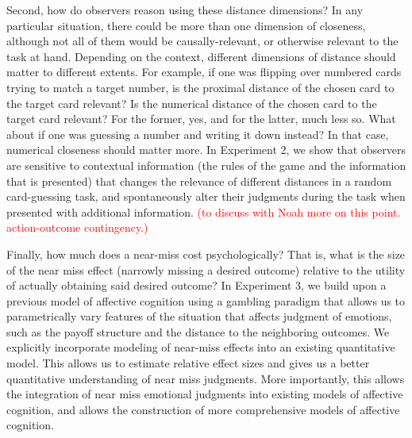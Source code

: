 \documentclass[10pt,letterpaper]{article}
\begin{document}

Second, how do observers reason using these distance dimensions? In any particular situation, there could be more than one dimension of closeness, although not all of them would be causally-relevant, or otherwise relevant to the task at hand. Depending on the context, different dimensions of distance should matter to different extents. For example, if one was flipping over numbered cards trying to match a target number, is the proximal distance of the chosen card to the target card relevant? Is the numerical distance of the chosen card to the target card relevant? For the former, yes, and for the latter, much less so. What about if one was guessing a number and writing it down instead? In that case, numerical closeness should matter more. In Experiment 2, we show that observers are sensitive to contextual information (the rules of the game and the information that is presented) that changes the relevance of different distances in a random card-guessing task, and spontaneously alter their judgments during the task when presented with additional information.
\textcolor{red}{(to discuss with Noah more on this point. action-outcome contingency.)} %

Finally, how much does a near-miss cost psychologically? That is, what is the size of the near miss effect (narrowly missing a desired outcome) relative to the utility of actually obtaining said desired outcome? In Experiment 3, we build upon a previous model of affective cognition \cite{OngAffCog} using a gambling paradigm that allows us to parametrically vary features of the situation that affects judgment of emotions, such as the payoff structure and the distance to the neighboring outcomes. We explicitly incorporate modeling of near-miss effects into an existing quantitative model. This allows us to estimate relative effect sizes and gives us a better quantitative understanding of near miss judgments. More importantly, this allows the integration of near miss emotional judgments into existing models of affective cognition, and allows the construction of more comprehensive models of affective cognition.  




\end{document}
